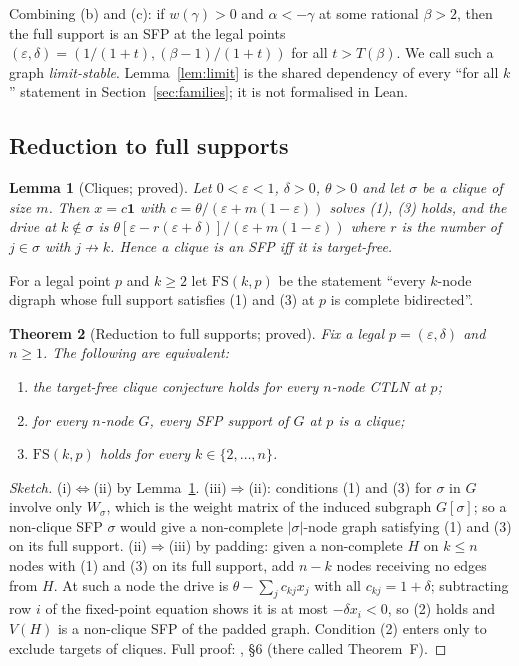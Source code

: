 \documentclass[11pt]{article}
\newtheorem{theorem}{Theorem}[section]
\newtheorem{lemma}[theorem]{Lemma}
\theoremstyle{definition}
\newcommand{\one}{\mathbf{1}}
\newcommand{\eps}{\varepsilon}
\begin{document}
Combining (b) and (c): if $w(\gamma)>0$ and $\alpha<-\gamma$ at some rational $\beta>2$, then the full support
is an SFP at the legal points $(\eps,\delta)=(1/(1+t),(\beta-1)/(1+t))$ for all $t>T(\beta)$. We call such a
graph \emph{limit-stable}. Lemma~\ref{lem:limit} is the shared dependency of every ``for all $k$''
statement in Section~\ref{sec:families}; it is not formalised in Lean.

\subsection{Reduction to full supports}
\begin{lemma}[Cliques; proved]\label{lem:clique}
Let $0<\eps<1$, $\delta>0$, $\theta>0$ and let $\sigma$ be a clique of size $m$. Then $x=c\one$ with
$c=\theta/(\eps+m(1-\eps))$ solves (1), (3) holds, and the drive at $k\notin\sigma$ is
$\theta[\eps-r(\eps+\delta)]/(\eps+m(1-\eps))$ where $r$ is the number of $j\in\sigma$ with $j\not\to k$.
Hence a clique is an SFP iff it is target-free.
\end{lemma}

For a legal point $p$ and $k\ge2$ let $\mathrm{FS}(k,p)$ be the statement ``every $k$-node digraph whose full
support satisfies (1) and (3) at $p$ is complete bidirected''.

\begin{theorem}[Reduction to full supports; proved]\label{thm:reduction}
Fix a legal $p=(\eps,\delta)$ and $n\ge1$. The following are equivalent:
\begin{enumerate}
\item[(i)] the target-free clique conjecture holds for every $n$-node CTLN at $p$;
\item[(ii)] for every $n$-node $G$, every SFP support of $G$ at $p$ is a clique;
\item[(iii)] $\mathrm{FS}(k,p)$ holds for every $k\in\{2,\dots,n\}$.
\end{enumerate}
\end{theorem}
\begin{proof}[Sketch]
(i)$\Leftrightarrow$(ii) by Lemma~\ref{lem:clique}. (iii)$\Rightarrow$(ii): conditions (1) and (3) for
$\sigma$ in $G$ involve only $W_\sigma$, which is the weight matrix of the induced subgraph $G[\sigma]$; so a
non-clique SFP $\sigma$ would give a non-complete $|\sigma|$-node graph satisfying (1) and (3) on its full
support. (ii)$\Rightarrow$(iii) by padding: given a non-complete $H$ on $k\le n$ nodes with (1) and (3) on
its full support, add $n-k$ nodes receiving no edges from $H$. At such a node the drive is
$\theta-\sum_jc_{kj}x_j$ with all $c_{kj}=1+\delta$; subtracting row $i$ of the fixed-point equation
shows it is at most $-\delta x_i<0$, so (2) holds and $V(H)$ is a non-clique SFP of the padded graph.
Condition (2) enters only to exclude targets of cliques. Full proof:
, \S6 (there called Theorem~F).
\end{proof}
\end{document}
